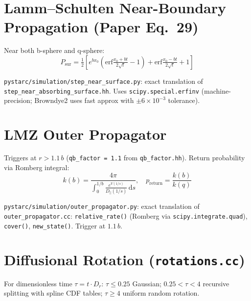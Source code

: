 \documentclass[12pt,a4paper]{article}
\newcommand{\OK}{\textcolor{cgreen}{\checkmark}}
\begin{document}
\section{Lamm--Schulten Near-Boundary Propagation (Paper Eq.~29)}

Near both b-sphere and q-sphere:
\begin{equation}
P_\mathrm{sur} = \tfrac{1}{2}\left[
  e^{bx_0}\!\left(\mathrm{erf}\tfrac{x_0+bt}{2\sqrt{t}}-1\right)
  +\mathrm{erf}\tfrac{x_0-bt}{2\sqrt{t}}+1\right]
\end{equation}

\begin{samebox}
\texttt{pystarc/simulation/step\_near\_surface.py}: exact translation of
\texttt{step\_near\_absorbing\_surface.hh}. Uses \texttt{scipy.special.erfinv}
(machine-precision; Browndye2 uses fast approx with $\pm 6\times10^{-3}$ tolerance). \OK
\end{samebox}

\section{LMZ Outer Propagator}

Triggers at $r > 1.1\,b$ (\texttt{qb\_factor = 1.1} from \texttt{qb\_factor.hh}).
Return probability via Romberg integral:
\begin{equation}
k(b) = \frac{4\pi}{\displaystyle\int_0^{1/b}\frac{e^{V(1/s)}}{D_\parallel(1/s)}\,\mathrm{d}s},
\quad
p_\mathrm{return} = \frac{k(b)}{k(q)}
\end{equation}

\begin{samebox}
\texttt{pystarc/simulation/outer\_propagator.py}: exact translation of
\texttt{outer\_propagator.cc}: \texttt{relative\_rate()} (Romberg via \texttt{scipy.integrate.quad}),
\texttt{cover()}, \texttt{new\_state()}. Trigger at $1.1\,b$. \OK
\end{samebox}

\section{Diffusional Rotation (\texttt{rotations.cc})}

For dimensionless time $\tau = t\cdot D_r$:
$\tau \leq 0.25$ Gaussian; $0.25 < \tau < 4$ recursive splitting with spline CDF tables;
$\tau \geq 4$ uniform random rotation.
\end{document}
